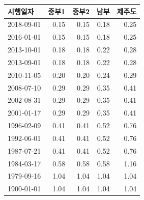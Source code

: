 \begin{defaulttable}
  \caption{\texttt{unknown} 최상층 지붕에 적용되는 열관류율
    $[\mathrm{W/(m^2K)}]$}
  \label{tbl:unknown-db-roof}
  {\small
  \renewcommand{\arraystretch}{1.05}
  \begin{tabular}{lrrrr}
    \toprule
    시행일자 & 중부1 & 중부2 & 남부 & 제주도 \\ \midrule
    2018-09-01 & 0.15 & 0.15 & 0.18 & 0.25 \\
    2016-01-01 & 0.15 & 0.15 & 0.18 & 0.25 \\
    2013-10-01 & 0.18 & 0.18 & 0.22 & 0.28 \\
    2013-09-01 & 0.18 & 0.18 & 0.22 & 0.28 \\
    2010-11-05 & 0.20 & 0.20 & 0.24 & 0.29 \\
    2008-07-10 & 0.29 & 0.29 & 0.35 & 0.41 \\
    2002-08-31 & 0.29 & 0.29 & 0.35 & 0.41 \\
    2001-01-17 & 0.29 & 0.29 & 0.35 & 0.41 \\
    1996-02-09 & 0.41 & 0.41 & 0.52 & 0.76 \\
    1992-06-01 & 0.41 & 0.41 & 0.52 & 0.76 \\
    1987-07-21 & 0.41 & 0.41 & 0.52 & 0.76 \\
    1984-03-17 & 0.58 & 0.58 & 0.58 & 1.16 \\
    1979-09-16 & 1.04 & 1.04 & 1.04 & 1.04 \\
    1900-01-01 & 1.04 & 1.04 & 1.04 & 1.04 \\
    \bottomrule
  \end{tabular}
  }
\end{defaulttable}

